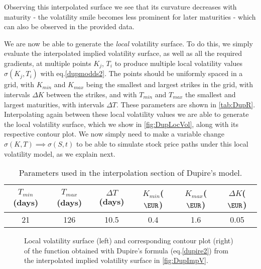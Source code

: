 Observing this interpolated surface we see that its curvature decreases with maturity - the volatility smile becomes less prominent for later maturities - which can also be observed in the provided data.


We are now be able to generate the \emph{local} volatility surface. To do this, we simply evaluate the interpolated implied volatility surface, as well as all the required gradients, at multiple points $K_j$, $T_i$ to produce multiple local volatility values $\sigma(K_j,T_i)$ with eq.\eqref{dupmodds2}. The points should be uniformly spaced in a grid, with $K_{min}$ and $K_{max}$ being the smallest and largest strikes in the grid, with intervals $\Delta K$ between the strikes, and with $T_{min}$ and $T_{max}$ the smallest and largest maturities, with intervals $\Delta T$. These parameters are shown in \autoref{tab:DupR}.
Interpolating again between these local volatility values we are able to generate the local volatility surface, which we show in \autoref{fig:DupLocVol}, along with its respective contour plot. We now simply need to make a variable change $\sigma(K,T)\implies \sigma(S,t)$ to be able to simulate stock price paths under this local volatility model, as we explain next.


\begin{table}[H]
    \centering
        \renewcommand{\arraystretch}{0.8}
\begin{tabular}{@{}cccccc@{}}
\toprule
$T_{min}$(days) & $T_{max}$(days) & $\Delta T$(days) & $K_{min}$($\EUR$) & $K_{max}$($\EUR$) & \multicolumn{1}{c}{$\Delta K$($\EUR$)}\\ \midrule
21 & 126 & 10.5 & 0.4 & 1.6 & \multicolumn{1}{c}{0.05} \\ \bottomrule
\end{tabular}
  \caption[Parameters used in the interpolation section of Dupire's model.]{Parameters used in the interpolation section of Dupire's model.}
  \label{tab:DupR}
\end{table}


\begin{figure}[H]
  \begin{subfigmatrix}{2}
  \end{subfigmatrix}
    \caption[Local volatility surface and corresponding contour plot of the function obtained with Dupire's formula from the interpolated implied volatility surface.]{Local volatility surface (left) and corresponding contour plot (right) of the function obtained with Dupire's formula (eq.\eqref{dupire2}) from the interpolated implied volatility surface in \autoref{fig:DupImpV}.}\label{fig:DupLocVol}
\end{figure}   

